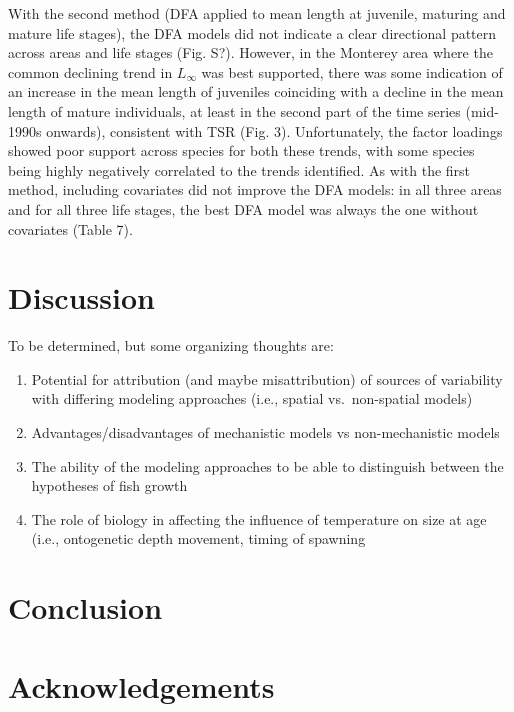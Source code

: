 \documentclass[
]{article}
\begin{document}
With the second method (DFA applied to mean length at juvenile, maturing
and mature life stages), the DFA models did not indicate a clear
directional pattern across areas and life stages (Fig. S?). However, in
the Monterey area where the common declining trend in \(L_{\infty}\) was
best supported, there was some indication of an increase in the mean
length of juveniles coinciding with a decline in the mean length of
mature individuals, at least in the second part of the time series
(mid-1990s onwards), consistent with TSR (Fig. 3). Unfortunately, the
factor loadings showed poor support across species for both these
trends, with some species being highly negatively correlated to the
trends identified. As with the first method, including covariates did
not improve the DFA models: in all three areas and for all three life
stages, the best DFA model was always the one without covariates (Table
7).

\hypertarget{discussion}{%
\section{Discussion}\label{discussion}}

To be determined, but some organizing thoughts are:

\begin{enumerate}
\def\labelenumi{\arabic{enumi})}
\item
  Potential for attribution (and maybe misattribution) of sources of
  variability with differing modeling approaches (i.e., spatial
  vs.~non-spatial models)
\item
  Advantages/disadvantages of mechanistic models vs non-mechanistic
  models
\item
  The ability of the modeling approaches to be able to distinguish
  between the hypotheses of fish growth
\item
  The role of biology in affecting the influence of temperature on size
  at age (i.e., ontogenetic depth movement, timing of spawning
\end{enumerate}

\hypertarget{conclusion}{%
\section{Conclusion}\label{conclusion}}

\hypertarget{acknowledgements}{%
\section*{Acknowledgements}\label{acknowledgements}}
\end{document}
